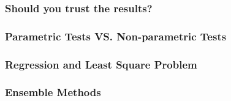 \documentclass[aspectratio=169, 10pt]{beamer}
\begin{document}
\begin{frame}
    \frametitle{Should you trust the results?}
    
    
\end{frame}

\begin{frame}
    \frametitle{Parametric Tests VS. Non-parametric Tests}
    
    
\end{frame}

\begin{frame}
    \frametitle{Regression and Least Square Problem}
    
    
\end{frame}

\begin{frame}
    \frametitle{Ensemble Methods}
    
    
\end{frame}
\end{document}
